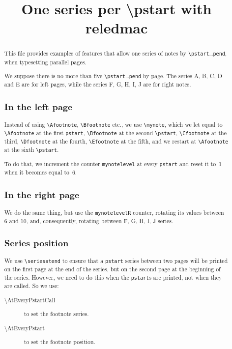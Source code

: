 \documentclass{article}
\newcounter{mynotelevel}%
\newcounter{mynotelevelR}%
\begin{document}
\date{}
\title{One series per \textbackslash pstart with reledmac}
\author{}
\maketitle
\begin{abstract}
This file provides examples of features that allow one series of notes by \verb+\pstart+…\verb+pend+, when typesetting parallel pages.

We suppose there is no more than five \verb+\pstart+…\verb+pend+ by page. The series A, B, C, D and E are for left pages, while the series F, G, H, I, J are for right notes.

\subsection*{In the left page}
Instead of using \verb+\Afootnote+, \verb+\Bfootnote+ etc., we use \verb+\mynote+, which we let equal to \verb+\Afootnote+ at the first \verb+pstart+, \verb+\Bfootnote+ at the second \verb+\pstart+, \verb+\Cfootnote+ at the third, \verb+\Dfootnote+ at the fourth, \verb+\Efootnote+ at the fifth, and we restart at \verb+\Afootnote+ at the sixth \verb+\pstart+.

To do that, we increment the counter \verb+mynotelevel+ at every \verb+pstart+ and reset it to~1 when it becomes equal to~6.



\subsection*{In the right page}

We do the same thing, but use the \verb+mynotelevelR+ counter, rotating its values between 6 and 10, and, consequently, rotating between F, G, H, I, J series.

\subsection*{Series position}
We use \verb+\seriesatend+ to ensure that a \verb+pstart+ series between two pages will be printed on the first page at the end of the series, but on the second page at the beginning of the series.
However, we need to do this when the \verb+pstart+s are printed, not when they are called. So we use:
\begin{description}
  \item[\textbackslash AtEveryPstartCall] to set the footnote series.
  \item[\textbackslash AtEveryPstart] to set the footnote position.
\end{description}
\end{abstract}
\end{document}
